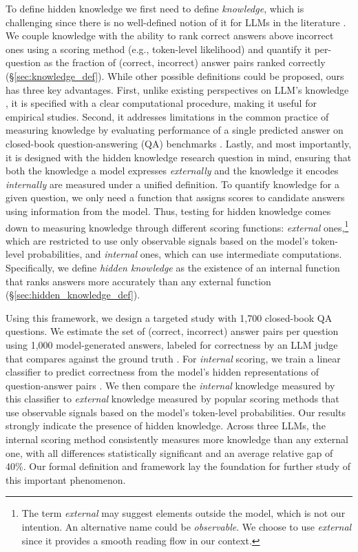 To define hidden knowledge we first need to define \textit{knowledge}, which is challenging since there is no well-defined notion of it for LLMs in the literature \citep{fierro2024defining}. We couple knowledge with the ability to rank correct answers above incorrect ones using a scoring method (e.g., token-level likelihood) and quantify it per-question as the fraction of (correct, incorrect) answer pairs ranked correctly (\S \ref{sec:knowledge_def}). While other possible definitions could be proposed, ours has three key advantages. First, unlike existing perspectives on LLM's knowledge \citep{fierro2024defining}, it is specified with a clear computational procedure, making it useful for empirical studies. Second, it addresses limitations in the common practice of measuring knowledge 
by evaluating performance of a single predicted answer
on closed-book question-answering (QA) benchmarks \citep{LLMs_as_KG_1, SimpleQA}. Lastly, and most importantly, it is designed with the hidden knowledge research question in mind, ensuring that both the knowledge a model expresses \textit{externally} and the knowledge it encodes \textit{internally} are measured under a unified definition. To quantify knowledge for a given question, we only need a function that assigns scores to candidate answers  using information from the model. Thus, testing for hidden knowledge comes down to measuring knowledge through different scoring functions: \textit{external} ones,\footnote{The term \textit{external} may suggest elements outside the model, which is not our intention. An alternative name could be \textit{observable}. We choose to use \textit{external} since it provides a smooth reading flow in our context.} which are restricted to use only observable signals based on the model's token-level probabilities, and \textit{internal} ones, which can use intermediate computations. Specifically, we define \textit{hidden knowledge} as the existence of an internal function that ranks answers more accurately than any external function (\S \ref{sec:hidden_knowledge_def}).


Using this framework, we design a targeted study with 1,700 closed-book QA questions. We estimate the set of (correct, incorrect) answer pairs per question using 1,000 model-generated answers, labeled for correctness by an LLM judge that compares against the ground truth \citep{SimpleQA}. 
For \textit{internal} scoring, we train a linear classifier to predict correctness from the model's hidden representations of question-answer pairs
\citep{hupkes2018jair,belinkov2019tacl}. 
We then compare the \textit{internal} knowledge measured by this classifier to \textit{external} knowledge measured by popular scoring methods that use observable signals based on the model's 
token-level probabilities. Our results strongly indicate the presence of hidden knowledge. Across three LLMs, the internal scoring method consistently measures more knowledge than any external one, with all differences statistically significant and an average relative gap of 40\%. 
Our formal definition and framework
lay the foundation for further study of this important phenomenon.

